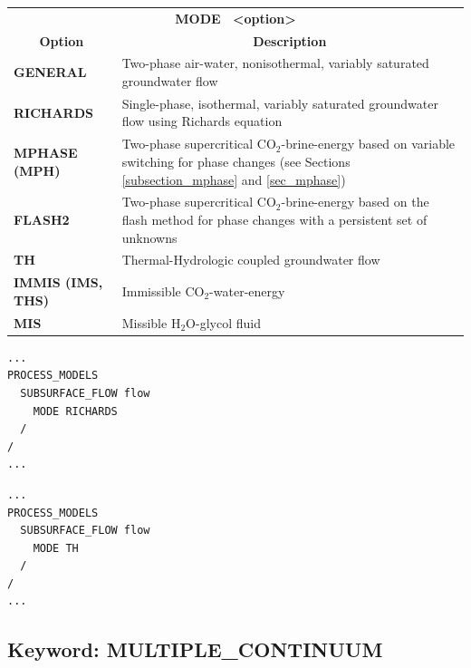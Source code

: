 
\begin{tabularx}{\linewidth}{lX}
\multicolumn{2}{c}{\bf MODE \ <option>}\\
\multicolumn{1}{c}{\bf Option} & \multicolumn{1}{c}{\bf Description}\\
\bf GENERAL & Two-phase air-water, nonisothermal, variably saturated groundwater flow\\
\bf RICHARDS & Single-phase, isothermal, variably saturated groundwater flow using Richards equation\\
\bf MPHASE (MPH) & Two-phase supercritical CO$_2$-brine-energy based on variable switching for phase changes (see Sections \ref{subsection_mphase} and \ref{sec_mphase})\\
\bf FLASH2 & Two-phase supercritical CO$_2$-brine-energy based on the flash method for phase changes with a persistent set of unknowns\\
\bf TH & Thermal-Hydrologic coupled groundwater flow\\
\bf IMMIS (IMS, THS) & Immissible CO$_2$-water-energy\\
\bf MIS & Missible H$_2$O-glycol fluid\\
\end{tabularx}

\begin{mdframed}
\footnotesize
\begin{verbatim}
...
PROCESS_MODELS
  SUBSURFACE_FLOW flow
    MODE RICHARDS
  /
/
...
\end{verbatim}

\begin{verbatim}
...
PROCESS_MODELS
  SUBSURFACE_FLOW flow
    MODE TH
  /
/
...

\end{verbatim}
\normalsize
\end{mdframed}

\hyperlink{target_key}{\return}


\newpage
\protect\hypertarget{target_mc}{}

\subsection{Keyword: MULTIPLE\_CONTINUUM}

